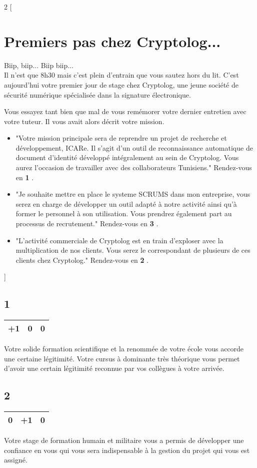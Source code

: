 \documentclass[12pt,a4paper,titlepage]{article}
\newcommand{\n}[1]{\textbf{#1} }
\newcommand{\update}[3]{
\begin{center}
\begin{tabular}{|c|c|c|}
\hline #1 & #2 & #3 \\ \hline
\end{tabular}
\end{center}
}
\begin{document}
\begin{multicols}{2}
[
\section{Premiers pas chez Cryptolog...}
Biip, biip... Biip biip... \\
Il n'est que 8h30 mais c'est plein d'entrain que vous sautez hors du lit. C'est aujourd'hui votre premier jour de stage chez Cryptolog, une jeune société de sécurité numérique spécialisée dans la signature électronique.

Vous essayez tant bien que mal de vous remémorer votre dernier entretien avec votre tuteur. Il vous avait alors décrit votre mission.
\begin{itemize}
\item "Votre mission principale sera de reprendre un projet de recherche et développement, ICARe. Il s'agit d'un outil de reconnaissance automatique de document d'identité développé intégralement au sein de Cryptolog. Vous aurez l'occasion de travailler avec des collaborateurs Tunisiens." Rendez-vous en \n{1}.
\item "Je souhaite mettre en place le systeme SCRUMS dans mon entreprise, vous serez en charge de développer un outil adapté à notre activité ainsi qu'à former le personnel à son utilisation. Vous prendrez également part au processus de recrutement." Rendez-vous en \n{3}.
\item "L'activité commerciale de Cryptolog est en train d'exploser avec la multiplication de nos clients. Vous serez le correspondant de plusieurs de ces clients chez Cryptolog." Rendez-vous en \n{2}.
\end{itemize}
]


\label{n1}
\subsection*{1}
\update{+1}{0}{0}
Votre solide formation scientifique et la renommée de votre école vous accorde une certaine légitimité. Votre cursus à dominante très théorique vous permet d'avoir une certain légitimité reconnue par vos collègues à votre arrivée.

\label{n2}
\subsection*{2}
\update{0}{+1}{0}
Votre stage de formation humain et militaire vous a permis de développer une confiance en vous qui vous sera indispensable à la gestion du projet qui vous est assigné.


\end{multicols}
\end{document}
